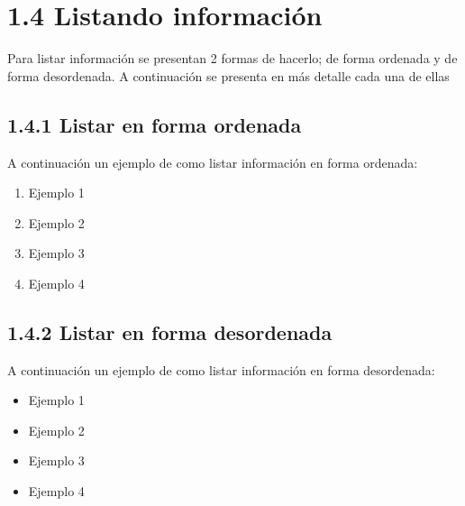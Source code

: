 \section{1.4 Listando información}

Para listar información se presentan 2 formas de hacerlo; de forma ordenada y de forma desordenada. A continuación se presenta en más detalle cada una de ellas

\subsection{1.4.1 Listar en forma ordenada}

A continuación un ejemplo de como listar información en forma ordenada:
\begin{enumerate}
    \item Ejemplo 1
    \item Ejemplo 2
    \item Ejemplo 3
    \item Ejemplo 4
\end{enumerate}

\subsection{1.4.2 Listar en forma desordenada}

A continuación un ejemplo de como listar información en forma desordenada:
\begin{itemize}
    \item Ejemplo 1
    \item Ejemplo 2
    \item Ejemplo 3
    \item Ejemplo 4
\end{itemize}